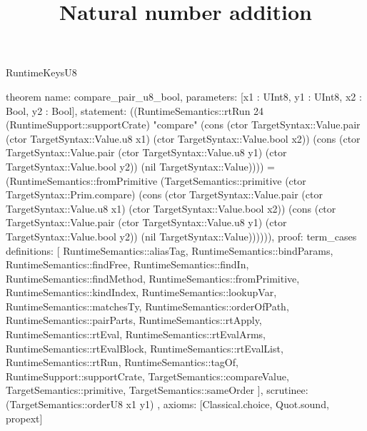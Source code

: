 \begin{lexlean}{RuntimeKeysU8}
\title{Natural number addition}
\begin{semanticmodule}
theorem{
  name: compare_pair_u8_bool,
  parameters: [x1 : UInt8, y1 : UInt8, x2 : Bool, y2 : Bool],
  statement: ((RuntimeSemantics::rtRun 24 (RuntimeSupport::supportCrate) "compare" (cons (ctor TargetSyntax::Value.pair (ctor TargetSyntax::Value.u8 x1) (ctor TargetSyntax::Value.bool x2)) (cons (ctor TargetSyntax::Value.pair (ctor TargetSyntax::Value.u8 y1) (ctor TargetSyntax::Value.bool y2)) (nil TargetSyntax::Value)))) = (RuntimeSemantics::fromPrimitive (TargetSemantics::primitive (ctor TargetSyntax::Prim.compare) (cons (ctor TargetSyntax::Value.pair (ctor TargetSyntax::Value.u8 x1) (ctor TargetSyntax::Value.bool x2)) (cons (ctor TargetSyntax::Value.pair (ctor TargetSyntax::Value.u8 y1) (ctor TargetSyntax::Value.bool y2)) (nil TargetSyntax::Value)))))),
  proof: term_cases{
    definitions: [
      RuntimeSemantics::aliasTag,
      RuntimeSemantics::bindParams,
      RuntimeSemantics::findFree,
      RuntimeSemantics::findIn,
      RuntimeSemantics::findMethod,
      RuntimeSemantics::fromPrimitive,
      RuntimeSemantics::kindIndex,
      RuntimeSemantics::lookupVar,
      RuntimeSemantics::matchesTy,
      RuntimeSemantics::orderOfPath,
      RuntimeSemantics::pairParts,
      RuntimeSemantics::rtApply,
      RuntimeSemantics::rtEval,
      RuntimeSemantics::rtEvalArms,
      RuntimeSemantics::rtEvalBlock,
      RuntimeSemantics::rtEvalList,
      RuntimeSemantics::rtRun,
      RuntimeSemantics::tagOf,
      RuntimeSupport::supportCrate,
      TargetSemantics::compareValue,
      TargetSemantics::primitive,
      TargetSemantics::sameOrder
    ],
    scrutinee: (TargetSemantics::orderU8 x1 y1)
  },
  axioms: [Classical.choice, Quot.sound, propext]
}


\end{semanticmodule}
\end{lexlean}
